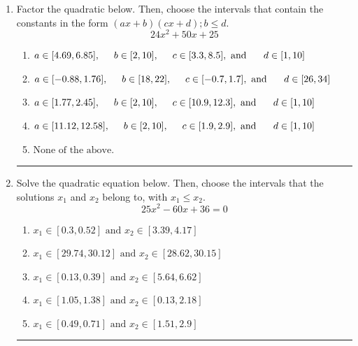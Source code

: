 \documentclass[14pt]{extbook}
\newcommand{\litem}[1]{\item#1\hspace*{-1cm}\rule{\textwidth}{0.4pt}}
\begin{document}
\begin{enumerate}
{\begin{enumerate}[label=\Alph*.]
\end{enumerate} }
\litem{
Factor the quadratic below. Then, choose the intervals that contain the constants in the form $(ax+b)(cx+d); b \leq d.$\[ 24x^{2} +50 x + 25 \]\begin{enumerate}[label=\Alph*.]
\item \( a \in [4.69, 6.85], \hspace*{5mm} b \in [2, 10], \hspace*{5mm} c \in [3.3, 8.5], \text{ and } \hspace*{5mm} d \in [1, 10] \)
\item \( a \in [-0.88, 1.76], \hspace*{5mm} b \in [18, 22], \hspace*{5mm} c \in [-0.7, 1.7], \text{ and } \hspace*{5mm} d \in [26, 34] \)
\item \( a \in [1.77, 2.45], \hspace*{5mm} b \in [2, 10], \hspace*{5mm} c \in [10.9, 12.3], \text{ and } \hspace*{5mm} d \in [1, 10] \)
\item \( a \in [11.12, 12.58], \hspace*{5mm} b \in [2, 10], \hspace*{5mm} c \in [1.9, 2.9], \text{ and } \hspace*{5mm} d \in [1, 10] \)
\item \( \text{None of the above.} \)

\end{enumerate} }
\litem{
Solve the quadratic equation below. Then, choose the intervals that the solutions $x_1$ and $x_2$ belong to, with $x_1 \leq x_2$.\[ 25x^{2} -60 x + 36 = 0 \]\begin{enumerate}[label=\Alph*.]
\item \( x_1 \in [0.3, 0.52] \text{ and } x_2 \in [3.39, 4.17] \)
\item \( x_1 \in [29.74, 30.12] \text{ and } x_2 \in [28.62, 30.15] \)
\item \( x_1 \in [0.13, 0.39] \text{ and } x_2 \in [5.64, 6.62] \)
\item \( x_1 \in [1.05, 1.38] \text{ and } x_2 \in [0.13, 2.18] \)
\item \( x_1 \in [0.49, 0.71] \text{ and } x_2 \in [1.51, 2.9] \)


\end{enumerate}}
\end{enumerate}
\end{document}
